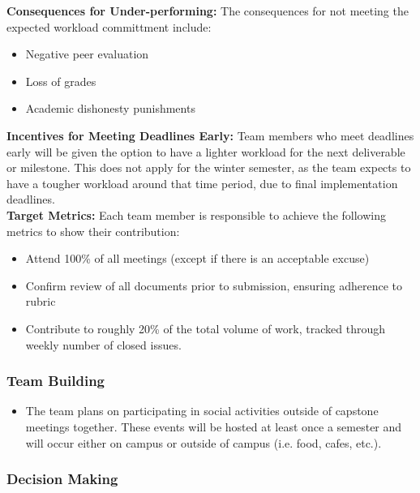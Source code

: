 \documentclass{article}
\begin{document}
\noindent\textbf{Consequences for Under-performing:}
The consequences for not meeting the expected workload committment include: 
\begin{itemize}
  \item Negative peer evaluation
  \item Loss of grades
  \item Academic dishonesty punishments
\end{itemize}


\noindent\textbf{Incentives for Meeting Deadlines Early:} Team members who meet deadlines early will be given the option
to have a lighter workload for the next deliverable or milestone. This does not apply for the winter semester,
as the team expects to have a tougher workload around that time period, due to final implementation deadlines. \\

\noindent\textbf{Target Metrics:}
Each team member is responsible to achieve the following metrics to show their contribution:
\begin{itemize}
  \item Attend 100\% of all meetings (except if there is an acceptable excuse)
  \item Confirm review of all documents prior to submission, ensuring adherence to rubric
  \item Contribute to roughly 20\% of the total volume of work, tracked through weekly number of closed issues.
\end{itemize}


\subsubsection*{Team Building}

\begin{itemize}
  \item The team plans on participating in social activities outside of capstone meetings together. These events will be hosted at least once a semester and will occur either on campus or outside of campus (i.e. food, cafes, etc.).  
\end{itemize}  


\subsubsection*{Decision Making} 

\end{document}
